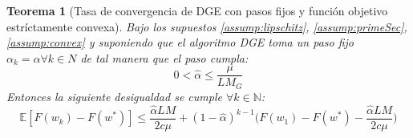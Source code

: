 \documentclass{book}
\theoremstyle{plain}
\newtheorem{thm}{Teorema}[section]
\theoremstyle{definition}
\theoremstyle{remark}
\begin{document}
\begin{thm}[Tasa de convergencia de DGE con pasos fijos y función objetivo estríctamente convexa]
Bajo los supuestos \ref{assump:lipschitz}, \ref{assump:primeSec}, \ref{assump:convex} y suponiendo que el algoritmo DGE toma un paso fijo $\alpha_k = \hat{\alpha}\forall k \in N$ de tal manera que el paso cumpla: 
\begin{equation}\label{eq:paso}
        0 < \hat{\alpha}\leq\frac{\mu}{L M_G}
\end{equation}
Entonces la siguiente desigualdad se cumple $\forall k \in \mathbb{N}$:
\begin{equation}\label{eq:convergence}
    \mathbb{E}[F(w_k)- F(w^*)] \leq \frac{\hat{\alpha}LM}{2c\mu} + (1-\hat{\alpha})^{k-1}\Big(F(w_1)-F(w^*)-\frac{\hat{\alpha} LM}{2c\mu}\Big)
\end{equation}
\end{thm}
\end{document}
